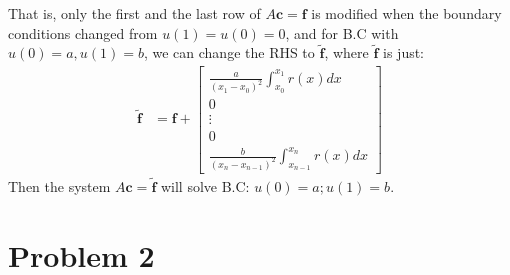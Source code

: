 \documentclass[]{article}
\begin{document}
        That is, only the first and the last row of $A\mathbf{c} = \mathbf{f}$ is modified when the boundary conditions changed from $u(1) = u(0) = 0$, and for B.C with $u(0) = a, u(1) = b$, we can change the RHS to $\tilde{\mathbf{f}}$, where $\tilde{\mathbf{f}}$ is just: 
        \begin{align*}\tag{1.e.6}\label{eqn:1.e.6}
            \tilde{\mathbf{f}} &= 
            \mathbf{f} + 
            \begin{bmatrix}
                \frac{a}{(x_1 - x_0)^2}\int_{x_0}^{x_1} 
                    r(x)
                dx
                \\
                0
                \\
                \vdots 
                \\
                0 
                \\
                \frac{b}{(x_n - x_{n - 1})^2}\int_{x_{n - 1}}^{x_n} 
                r(x)
                dx
            \end{bmatrix}
        \end{align*}
        Then the system $A\mathbf{c} = \tilde{\mathbf{f}}$ will solve B.C: $u(0) = a; u(1) = b$. 
    

\section*{Problem 2}
\end{document}
